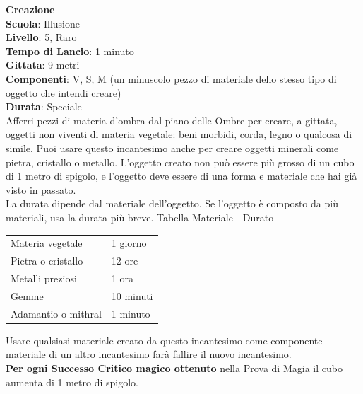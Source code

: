 \begin{multicols}{2}
\medskip\textbf{Creazione}\\
\textbf{Scuola}: Illusione\\
\textbf{Livello}: 5, Raro\\
\textbf{Tempo di Lancio}: 1 minuto\\
\textbf{Gittata}: 9 metri\\
\textbf{Componenti}: V, S, M (un minuscolo pezzo di materiale dello stesso tipo di oggetto che intendi creare) \\
\textbf{Durata}: Speciale\\
Afferri pezzi di materia d'ombra dal piano delle Ombre per creare, a gittata, oggetti non viventi di materia vegetale: beni morbidi, corda, legno o qualcosa di simile. Puoi usare questo incantesimo anche per creare oggetti minerali come pietra, cristallo o metallo. L'oggetto creato non può essere più grosso di un cubo di 1 metro di spigolo, e l'oggetto deve essere di una forma e materiale che hai già visto in passato.\\
La durata dipende dal materiale dell'oggetto. Se l'oggetto è composto da più materiali, usa la durata più breve.
\medskip
Tabella Materiale - Durato
\medskip

\begin{tabularx}{0.45\textwidth}{lX}
	\hline
	Materia vegetale &1 giorno\\
	Pietra o cristallo &12 ore\\
	Metalli preziosi &1 ora\\
	Gemme &10 minuti\\
	Adamantio o mithral &1 minuto\\
\end{tabularx}
\medskip

Usare qualsiasi materiale creato da questo incantesimo come componente materiale di un altro incantesimo farà fallire il nuovo incantesimo.\\
\textbf{Per ogni Successo Critico magico ottenuto} nella Prova di Magia il cubo aumenta di 1 metro di spigolo.


\end{multicols}
